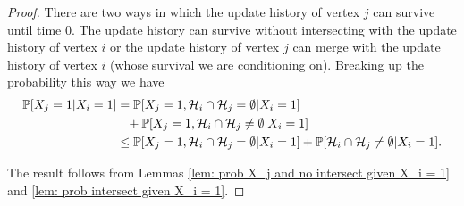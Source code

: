 	\begin{proof}
		There are two ways in which the update history of vertex $j$ can survive until time $0$. The update history can survive without intersecting with the update history of vertex $i$ or the update history of vertex $j$ can merge with the update history of vertex $i$ (whose survival we are conditioning on). %
		Breaking up the probability this way we have
		\begin{align}
			\mathbb{P}[X_j = 1| X_i = 1] &= \mathbb{P}[X_j = 1, \mathcal{H}_i \cap \mathcal{H}_j = \emptyset | X_i = 1] \notag\\
			&\phantom{=}+ \mathbb{P}[X_j = 1, \mathcal{H}_i \cap \mathcal{H}_j \neq \emptyset | X_i = 1]\\
			&\leq \mathbb{P}[X_j = 1, \mathcal{H}_i \cap \mathcal{H}_j = \emptyset | X_i = 1] + \mathbb{P}[\mathcal{H}_i \cap \mathcal{H}_j \neq \emptyset | X_i = 1].
		\end{align}

		The result follows from Lemmas \ref{lem: prob X_j and no intersect given X_i = 1} and \ref{lem: prob intersect given X_i = 1}.
	\end{proof}

